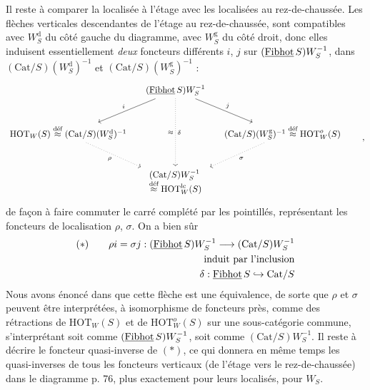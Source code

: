  Il reste à comparer la localisée à l’étage avec les localisées au rez-de-chaussée. Les flèches verticales descendantes de l’étage au rez-de-chaussée, sont compatibles avec $W_S^{\mathrm{d}}$ du côté gauche du diagramme, avec $W_S^{\mathrm{g}}$ du côté droit, donc elles induisent essentiellement \textit{deux} foncteurs différents
$i$, $j$ sur $(\underline{\mathrm{Fibhot}}\,S)W_S^{-1}$, dans $(\mathrm{Cat}/S)(W_S^{\mathrm{d}})^{-1}$ et $(\mathrm{Cat}/S)(W_S^{\mathrm{g}})^{-1}$ :
\[
\begin{tikzcd}[column sep=small, row sep=large]
& (\usl{Fibhot}\,S)W_S^{-1} \arrow[dl, "i"'] \arrow[dr, "j"] \arrow[dd, dotted, "\approx"', "\delta"] & \\
\mathrm{HOT}_W(S) \overset{\text{déf}}{\approx} (\mathrm{Cat}/S)(W_S^{\mathrm{d}})^{-1} \arrow[dr, dotted, "\rho"'] & & (\mathrm{Cat}/S)(W_S^{\mathrm{g}})^{-1} \overset{\text{déf}}{\approx} \mathrm{HOT}^{o}_{W}(S) \arrow[dl, dotted, "\sigma"] \\
& \begin{array}{l} (\mathrm{Cat}/S)W_S^{-1} \\ \overset{\text{déf}}{\approx} \mathrm{HOT}^{\mathrm{lc}}_{W}(S) \end{array} &
\end{tikzcd}
\qquad ,
\]
de façon à faire commuter le carré complété par les pointillés, représentant les foncteurs de localisation $\rho$, $\sigma$. On a bien sûr
\[
\begin{aligned}
(*) \qquad \rho i = \sigma j : (\underline{\mathrm{Fibhot}}\,S)W_S^{-1} \longrightarrow (\mathrm{Cat}/S)W_S^{-1}\\
\text{induit par l’inclusion}\\
\delta : \underline{\mathrm{Fibhot}}\,S \hookrightarrow \mathrm{Cat}/S
\end{aligned}
\]
Nous avons énoncé dans  que cette flèche est une équivalence, de sorte que $\rho$ et $\sigma$ peuvent être interprétées, à isomorphisme de foncteurs près, comme des rétractions de $\mathrm{HOT}_W(S)$ et de $\mathrm{HOT}^{o}_{W}(S)$ sur une sous-catégorie commune, s’interprétant soit comme $(\underline{\mathrm{Fibhot}}\,S)W_S^{-1}$, soit comme $(\mathrm{Cat}/S)W_S^{-1}$. Il reste à décrire le foncteur quasi-inverse de $(*)$, ce qui donnera en même temps les quasi-inverses de tous les foncteurs verticaux (de l’étage vers le rez-de-chaussée) dans le diagramme p. 76, plus exactement pour leurs localisés, pour $W_S$.

